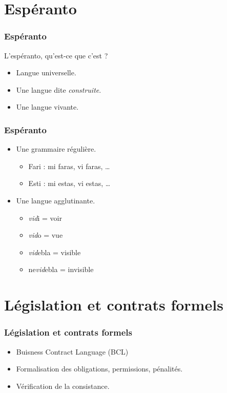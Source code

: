 \documentclass{beamer}
\begin{document}
\section{Espéranto}

\begin{frame}
\frametitle{Espéranto}
\begin{block}{L'espéranto, qu'est-ce que c'est ?}
\begin{itemize}
\item Langue universelle.
\item Une langue dite \emph{construite}.
\item Une langue vivante.
\end{itemize}
\end{block}
\end{frame}

\begin{frame}
\frametitle{Espéranto}
\begin{itemize}
\item Une grammaire régulière.
\begin{itemize}
\item Fari : mi faras, vi faras, \dots
\item Esti : mi estas, vi estas, \dots
\end{itemize}
\item Une langue agglutinante.
\begin{itemize}
\item {\color{brown}\emph{vid}}i = voir
\item {\color{brown}\emph{vid}}o = vue
\item {\color{brown}\emph{vid}}ebla = visible
\item ne{\color{brown}\emph{vid}}ebla = invisible
\end{itemize}
\end{itemize}
\end{frame}

\section[Contrats]{Législation et contrats formels}

\begin{frame}
  \frametitle{Législation et contrats formels}
  \begin{itemize}
  \item Buisness Contract Language (BCL)%
  \item Formalisation des obligations, permissions, pénalités.%
  \item Vérification de la consistance.
  \end{itemize}
\end{frame}
\end{document}

